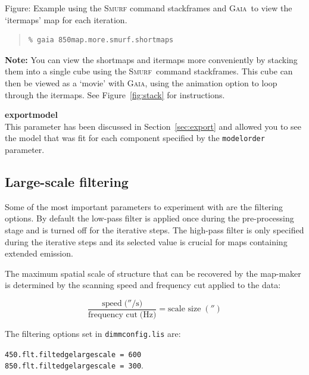 \documentclass[twoside,11pt]{article}
\newcommand{\htmladdimg}[1]{}
\newcommand{\htmlref}[2]{#1}
\newcommand{\latexhtml}[2]{#1}
\newcommand{\xref}[3]{#1}
\newcommand{\xlabel}[1]{}
\renewcommand{\_}{\texttt{\symbol{95}}}
\newenvironment{myquote}{
   \color{MidnightBlue}\begin{quote}\begin{small}}{
   \end{small}\end{quote}
}
\newcommand{\gaia}{\xref{\textsc{Gaia}}{sun214}{}}
\newcommand{\smurf}{\xref{\textsc{Smurf}}{sun258}{}}
\newcommand{\task}[1]{\textsf{#1}}
\newcommand{\param}[1]{\texttt{#1}}
\newcommand{\file}[1]{\texttt{#1}}
\newcommand{\stackframes}{\xref{\task{stackframes}}{sun258}{STACKFRAMES}}
\newcommand{\cref}[3]{\latexhtml{#1~\ref{#2}}{\htmlref{#3}{#2}}}
\renewenvironment{myquote}{
      \begin{quote}\begin{small}}{
      \end{small}\end{quote}
   }
\begin{document}
\begin{htmlonly}
\label{fig:stack} \htmladdimg{sc21_view_itermaps.png}
Figure: Example using the \textsc{Smurf} command \task{stackframes} and
\gaia\ to view the `itermaps' map for each iteration.
\end{htmlonly}

\begin{myquote}
\begin{verbatim}
% gaia 850map.more.smurf.shortmaps
\end{verbatim}
\end{myquote}

\textbf{Note:} You can view the shortmaps and itermaps more
conveniently by stacking them into a single cube using the \smurf\
command \stackframes. This cube can then be viewed as a
`movie' with \gaia, using the animation option to loop through the
itermaps. See \cref{Figure}{fig:stack}{the box above} for instructions.

\textbf{exportmodel}\\
This parameter has been discussed in
\cref{Section}{sec:export}{Exporting individual models} and allowed
you to see the model that was fit for each component specified by the
\param{modelorder} parameter.

\subsection{\xlabel{filt}Large-scale filtering}
\label{sec:filt}

Some of the most important parameters to experiment with are the
filtering options. By default the low-pass filter is applied once
during the pre-processing stage and is turned off for the iterative
steps. The high-pass filter is only specified during the iterative
steps and its selected value is crucial for maps containing extended
emission.

The maximum spatial scale of structure that can be recovered by the
map-maker is determined by the scanning speed and frequency cut
applied to the data:

\begin{equation}
\frac{\mbox{speed}\;(''/\mbox{s)}}{\mbox{frequency cut}\;(\mbox{Hz)}}=\mbox{scale size}\;('')
\end{equation}

The filtering options set in \file{dimmconfig.lis} are:

\param{450.flt.filt\_edge\_largescale~=~600} \\
\param{850.flt.filt\_edge\_largescale~=~300}.
\end{document}
